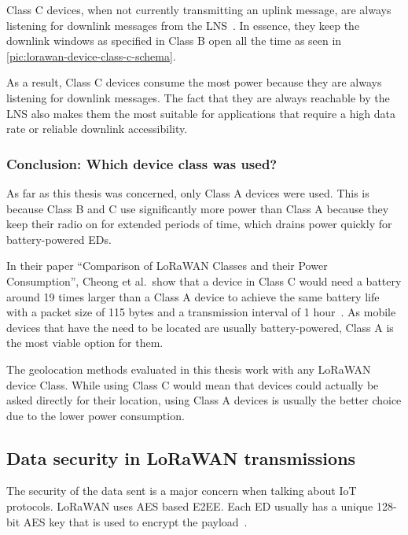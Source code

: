 Class C devices, when not currently transmitting an uplink message, are always listening for downlink messages from the \ac{LNS}~\cite[p. 86]{lora_alliance_inc_lorawan_specification_2017}.
In essence, they keep the downlink windows as specified in Class B open all the time as seen in \cref{pic:lorawan-device-class-c-schema}.

As a result, Class C devices consume the most power because they are always listening for downlink messages.
The fact that they are always reachable by the \ac{LNS} also makes them the most suitable for applications that require a high data rate or reliable downlink accessibility.

\subsubsection{Conclusion: Which device class was used?}

As far as this thesis was concerned, only Class A devices were used.
This is because Class B and C use significantly more power than Class A because they keep their radio on for extended periods of time, which drains power quickly for battery-powered \aclp{ED}.

In their paper ``Comparison of LoRaWAN Classes and their Power Consumption'', Cheong et al.\ show that a device in Class C would need a battery around 19 times larger than a Class A device to achieve the same battery life with a packet size of 115 bytes and a transmission interval of 1 hour~\cite{cheong_comparison_2017}.
As mobile devices that have the need to be located are usually battery-powered, Class A is the most viable option for them.

The geolocation methods evaluated in this thesis work with any \ac{LoRaWAN} device Class.
While using Class C would mean that devices could actually be asked directly for their location, using Class A devices is usually the better choice due to the lower power consumption.

\subsection{Data security in \ac{LoRaWAN} transmissions}

The security of the data sent is a major concern when talking about \ac{IoT} protocols.
\ac{LoRaWAN} uses \ac{AES} based \acf{E2EE}.
Each \acl{ED} usually has a unique 128-bit \ac{AES} key that is used to encrypt the payload~\cite[p. 24]{lora_alliance_inc_lorawan_specification_2017}.

